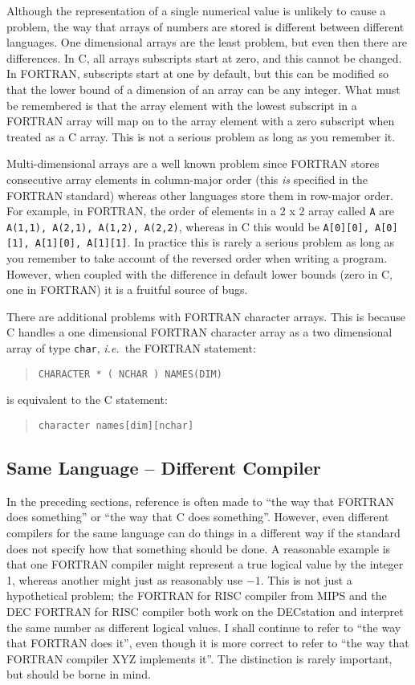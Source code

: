 \documentclass[twoside,11pt]{article}
\newcommand{\xlabel}[1]{}
\renewcommand{\_}{\texttt{\symbol{95}}}
\begin{document}
Although the representation of a single numerical value is unlikely to cause a
problem, the way that arrays of numbers are stored is different between
different languages. One dimensional arrays are the least problem, but even
then there are differences. In C, all arrays subscripts start at zero, and this
cannot be changed. In FORTRAN, subscripts start at one by default, but this can
be modified so that the lower bound of a dimension of an array can be any
integer. What must be remembered is that the array element with the lowest
subscript in a FORTRAN array will map on to the array element with a zero
subscript when treated as a C array. This is not a serious problem as long as
you remember it.

Multi-dimensional arrays are a well known problem since FORTRAN stores
consecutive array elements in column-major order (this \textit{is}\/ specified
in the FORTRAN standard) whereas other languages store them in row-major order.
For example, in FORTRAN, the order of elements in a 2 x 2 array called 
\texttt{A} are \texttt{A(1,1), A(2,1), A(1,2), A(2,2)}, whereas in C this would 
be \texttt{A[0][0], A[0][1], A[1][0], A[1][1]}. 
In practice this is rarely a serious problem as long as you
remember to take account of the reversed order when writing a program. However,
when coupled with the difference in default lower bounds (zero in C, one in
FORTRAN) it is a fruitful source of bugs.

There are additional problems with FORTRAN character arrays.
This is because C handles a one dimensional FORTRAN character array as a two 
dimensional array of type \texttt{char}, \textit{i.e.}\ the FORTRAN statement:

\begin{quote}
\texttt{CHARACTER * ( NCHAR ) NAMES(DIM)}
\end{quote}

is equivalent to the C statement:

\begin{quote}
\texttt{character names[dim][nchar]}
\end{quote}

\subsection{\xlabel{same_language_dash_different_compiler}Same Language -- Different Compiler}

In the preceding sections, reference is often made to ``the way that FORTRAN
does something'' or ``the way that C does something''. However, even different
compilers for the same language can do things in a different way if the
standard does not specify how that something should be done. A reasonable
example is that one FORTRAN compiler might represent a true logical value by
the integer 1, whereas another might just as reasonably use $-1$. This is not
just a hypothetical problem; the FORTRAN for RISC compiler from MIPS and the
DEC FORTRAN for RISC compiler both work on the DECstation and interpret the
same number as different logical values. I shall continue to refer to ``the way
that FORTRAN does it'', even though it is more correct to refer to ``the way 
that FORTRAN compiler XYZ implements it''.
The distinction is rarely important, but should be borne in mind.
\end{document}
